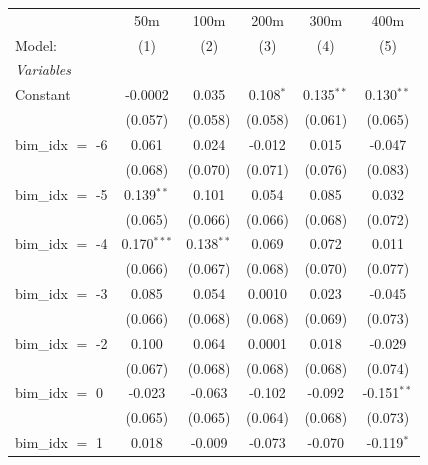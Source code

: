 
\begingroup
\centering
\begin{tabular}{lccccc}
   \tabularnewline \midrule \midrule
                       & 50m            & 100m           & 200m           & 300m           & 400m \\   
   Model:              & (1)            & (2)            & (3)            & (4)            & (5)\\  
   \midrule
   \emph{Variables}\\
   Constant            & -0.0002        & 0.035          & 0.108$^{*}$    & 0.135$^{**}$   & 0.130$^{**}$\\   
                       & (0.057)        & (0.058)        & (0.058)        & (0.061)        & (0.065)\\   
   bim\_idx $=$ -6     & 0.061          & 0.024          & -0.012         & 0.015          & -0.047\\   
                       & (0.068)        & (0.070)        & (0.071)        & (0.076)        & (0.083)\\   
   bim\_idx $=$ -5     & 0.139$^{**}$   & 0.101          & 0.054          & 0.085          & 0.032\\   
                       & (0.065)        & (0.066)        & (0.066)        & (0.068)        & (0.072)\\   
   bim\_idx $=$ -4     & 0.170$^{***}$  & 0.138$^{**}$   & 0.069          & 0.072          & 0.011\\   
                       & (0.066)        & (0.067)        & (0.068)        & (0.070)        & (0.077)\\   
   bim\_idx $=$ -3     & 0.085          & 0.054          & 0.0010         & 0.023          & -0.045\\   
                       & (0.066)        & (0.068)        & (0.068)        & (0.069)        & (0.073)\\   
   bim\_idx $=$ -2     & 0.100          & 0.064          & 0.0001         & 0.018          & -0.029\\   
                       & (0.067)        & (0.068)        & (0.068)        & (0.068)        & (0.074)\\   
   bim\_idx $=$ 0      & -0.023         & -0.063         & -0.102         & -0.092         & -0.151$^{**}$\\   
                       & (0.065)        & (0.065)        & (0.064)        & (0.068)        & (0.073)\\   
   bim\_idx $=$ 1      & 0.018          & -0.009         & -0.073         & -0.070         & -0.119$^{*}$\\   

\end{tabular}
